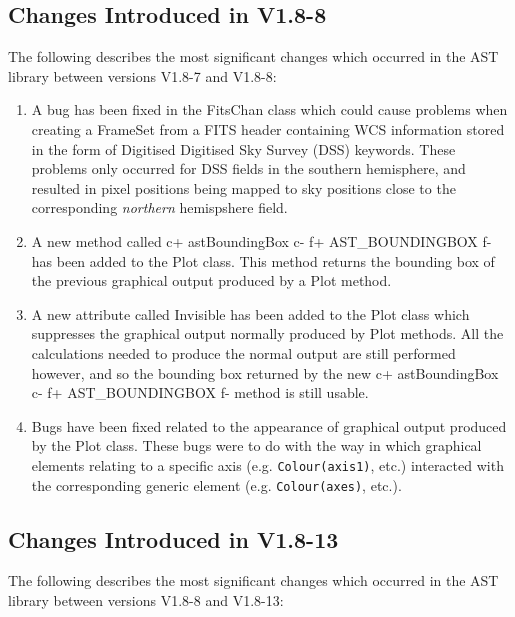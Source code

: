 \documentclass[twoside,11pt]{starlink}
\begin{document}
\subsection{Changes Introduced in V1.8-8}

The following describes the most significant changes which
occurred in the AST library between versions V1.8-7 and V1.8-8:

\begin{enumerate}

\item A bug has been fixed in the FitsChan class which could cause
problems when creating a FrameSet from a FITS header containing WCS
information stored in the form of Digitised Digitised Sky Survey (DSS)
keywords. These problems only occurred for DSS fields in the southern
hemisphere, and resulted in pixel positions being mapped to sky positions
close to the corresponding \emph{northern} hemispshere field.

\item A new method called
c+
astBoundingBox
c-
f+
AST\_BOUNDINGBOX
f-
has been added to the Plot class. This method returns the bounding box of
the previous graphical output produced by a Plot method.

\item A new attribute called Invisible has been added to the Plot class
which suppresses the graphical output normally produced by Plot methods.
All the calculations needed to produce the normal output are still
performed however, and so the bounding box returned by the new
c+
astBoundingBox
c-
f+
AST\_BOUNDINGBOX
f-
method is still usable.

\item Bugs have been fixed related to the appearance of graphical output
produced by the Plot class. These bugs were to do with the way in which
graphical elements relating to a specific axis (e.g. \texttt{Colour(axis1)}, etc.)
interacted with the corresponding generic element (e.g.
\texttt{Colour(axes)}, etc.).

\end{enumerate}


\subsection{Changes Introduced in V1.8-13}

The following describes the most significant changes which occurred
in the AST library between versions V1.8-8 and V1.8-13:
\end{document}
